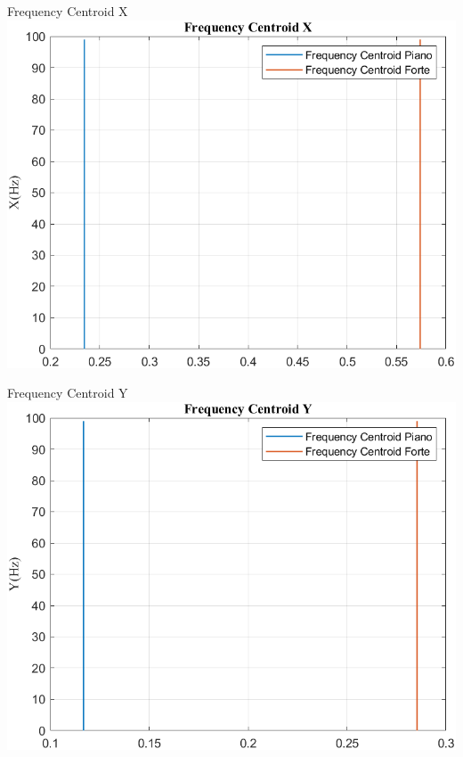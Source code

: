 \documentclass[beamer]{standalone}
\begin{document}
	\begin{frame}{{Frequency Centroid X}}
		\centering\includegraphics[height=.8\textheight]{figure/Acc/Trasformata/Frequency CentroidX}
	\end{frame}

	\begin{frame}{{Frequency Centroid Y}}
		\centering\includegraphics[height=.8\textheight]{figure/Acc/Trasformata/Frequency CentroidY}
	\end{frame}
	
\end{document}
